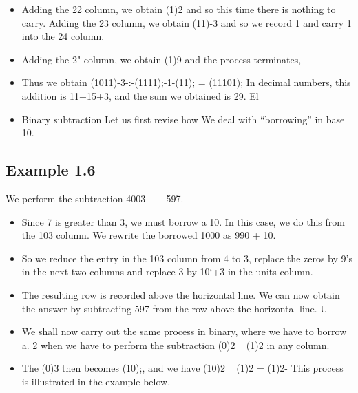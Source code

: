 \documentclass[a4paper,12pt]{article}
\begin{document}

\begin{itemize}
    \item Adding the 22 column, we obtain (1)2 and so this time there is nothing to carry. Adding the
23 column, we obtain (11)-3 and so we record 1 and carry 1 into the 24 column.
\item Adding the
2" column, we obtain (1)9 and the process terminates,
\item Thus we obtain (1011)-3-:-(1111);-1-(11); = (11101); In decimal numbers, this addition is 11+15+3,
and the sum we obtained is 29. El
\item Binary subtraction
Let us first revise how We deal with “borrowing” in base 10.
\end{itemize}

\subsection{Example 1.6} We perform the subtraction 4003 —~ 597.

\begin{itemize}
    \item Since 7 is greater than 3, we must borrow a 10. In this case, we do this from the 103 column. We
rewrite the borrowed 1000 as 990 + 10. 
\item So we reduce the entry in the 103 column from 4 to 3,
replace the zeros by 9’s in the next two columns and replace 3 by 10‘+3 in the units column. 
\item The
resulting row is recorded above the horizontal line. We can now obtain the answer by subtracting
597 from the row above the horizontal line. U
\item We shall now carry out the same process in binary, where we have to borrow a. 2 when we have to
perform the subtraction (0)2 ~ (1)2 in any column. 
\item The (0)3 then becomes (10);, and we have
(10)2 ~ (1)2 = (1)2-
This process is illustrated in the example below.
\end{itemize}
\end{document}

